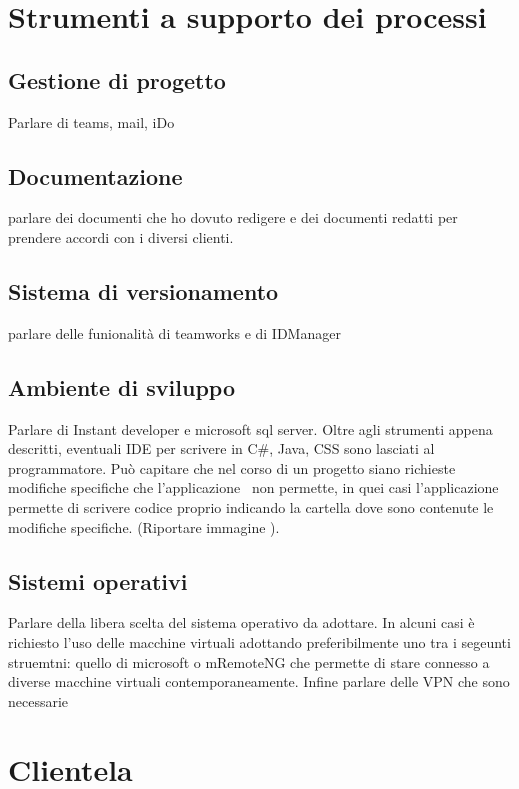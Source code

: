\section{Strumenti a supporto dei processi}
\subsection{Gestione di progetto}
Parlare di teams, mail, iDo

\subsection{Documentazione}
parlare dei documenti che ho dovuto redigere e dei documenti redatti per prendere accordi con i diversi clienti.

\subsection{Sistema di versionamento}
parlare delle funionalità di teamworks e di IDManager

\subsection{Ambiente di sviluppo}
Parlare di Instant developer e microsoft sql server.
Oltre agli strumenti appena descritti, eventuali IDE per scrivere in C\#, Java, CSS sono lasciati al programmatore. Può capitare che nel corso di un progetto siano richieste  modifiche specifiche che l'applicazione \inde\ non permette, in quei casi l'applicazione permette di scrivere codice proprio indicando la cartella dove sono contenute le modifiche specifiche. (Riportare immagine \todo).

\subsection{Sistemi operativi}
Parlare della libera scelta del sistema operativo da adottare. In alcuni casi è richiesto l'uso delle macchine virtuali adottando preferibilmente uno tra i segeunti struemtni: quello di microsoft o mRemoteNG che permette di stare connesso a diverse macchine virtuali contemporaneamente. Infine parlare delle VPN che sono necessarie


\section{Clientela}
